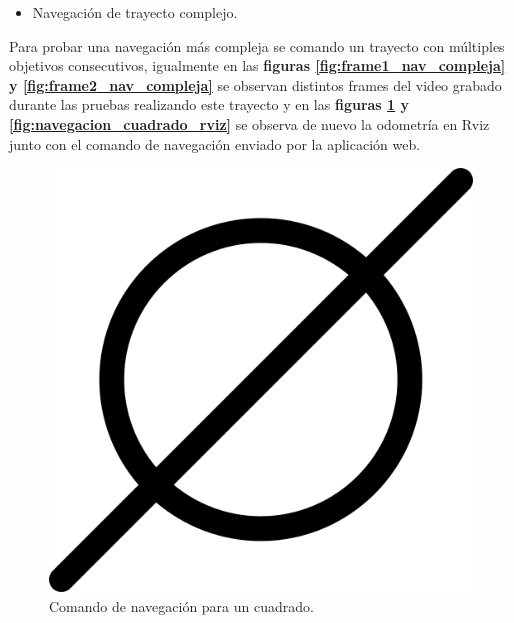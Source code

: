 \newpage
\begin{itemize}
  \item Navegación de trayecto complejo.
\end{itemize}
Para probar una navegación más compleja se comando un trayecto con múltiples objetivos consecutivos, igualmente en las \textbf{figuras \ref{fig:frame1_nav_compleja} y \ref{fig:frame2_nav_compleja}} se observan distintos frames 
del video grabado durante las pruebas realizando este trayecto y en las \textbf{figuras \ref{fig:navegacion_cuadrado_web} y \ref{fig:navegacion_cuadrado_rviz}} se observa de nuevo la odometría en Rviz junto con el comando de navegación enviado por la 
aplicación web.

\begin{figure}[htbp]
  \centering
  \begin{minipage}[b]{0.45\textwidth}
    \centering
    \includegraphics[width=\textwidth]{images/poner_foto.png}
    \caption{Comando de navegación para un cuadrado.}
    \label{fig:navegacion_cuadrado_web}
  \end{minipage}
  \hfill
  \begin{minipage}[b]{0.45\textwidth}
    \centering

\end{minipage}
\end{figure}
